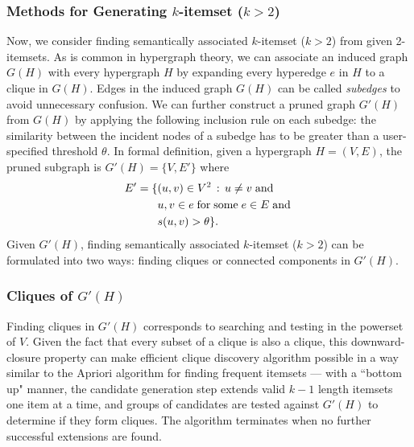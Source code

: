 \subsubsection{Methods for Generating $k$-itemset ($k>2$)}
Now, we consider finding semantically associated $k$-itemset ($k>2$) from given 2-itemsets.
As is common in hypergraph theory, we can associate an induced graph $G(H)$ with every hypergraph $H$ by expanding every hyperedge $e$ in $H$ to a clique in $G(H)$. Edges in the induced graph $G(H)$ can be called \emph{subedges} to avoid unnecessary confusion. We can further construct a pruned graph $G'(H)$ from $G(H)$ by applying the following inclusion rule on each subedge: the similarity between the incident nodes of a subedge has to be greater than a user-specified threshold $\theta$. In formal definition, given a hypergraph $H=(V,E)$, the pruned subgraph is $G'(H)=\{V,E'\}$ where
\begin{align}
\notag E'=\{&(u,v)\in V^2 \, : \, u \neq v \; \mathrm{and} \; \\
\notag &u, v \in e \; \mathrm{for} \; \mathrm{some} \; e \in E \; \mathrm{and} \; \\
\notag &s(u,v) > \theta\}.
\end{align}
Given $G'(H)$, finding semantically associated $k$-itemset ($k>2$) can be formulated into two ways: finding cliques or connected components in $G'(H)$.

\subsubsection{Cliques of $G'(H)$}
Finding cliques in $G'(H)$ corresponds to searching and testing in the powerset of $V$. Given the fact that every subset of a clique is also a clique, this downward-closure property can make efficient clique discovery algorithm possible in a way similar to the Apriori algorithm for finding frequent itemsets
--- with a ``bottom up" manner, the candidate generation step extends valid $k-1$ length itemsets one item at a time, and groups of candidates are tested against $G'(H)$ to determine if they form cliques. The algorithm terminates when no further successful extensions are found.

